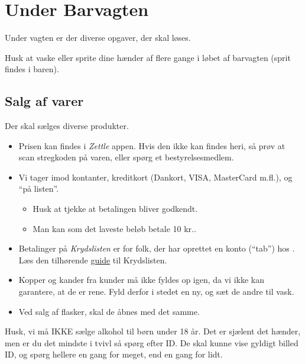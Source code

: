 \section{Under Barvagten}
\label{sec:intra-barvagten}

Under vagten er der diverse opgaver, der skal løses.

Husk at vaske eller sprite dine hænder af flere gange i løbet af barvagten
(sprit findes i baren).

\subsection{Salg af varer}
\label{sec:intra:salg}

Der skal sælges diverse produkter.
\begin{itemize}
    \item Prisen kan findes i \textit{Zettle} appen. Hvis den ikke kan findes heri, 
    så prøv at scan stregkoden på varen, eller spørg et bestyrelsesmedlem.
    \item Vi tager imod kontanter, kreditkort (Dankort, VISA, MasterCard
    m.fl.), og ``på listen''.
    \begin{itemize}
        \item Husk at tjekke at betalingen bliver godkendt.
        \item Man kan som det laveste beløb betale 10 kr..
    \end{itemize}
    \item Betalinger på \textit{Krydslisten} er for folk, der har oprettet en konto
    (``tab'') hos \fredagscafeen. Læs den tilhørende \href{https://media.fredagscafeen.dk/guides/krydsliste.pdf}{guide} til Krydslisten.
    \item Kopper og kander fra kunder må ikke fyldes op igen, da vi ikke kan garantere, at de er rene. 
    Fyld derfor i stedet en ny, og sæt de andre til vask.
    \item Ved salg af flasker, skal de åbnes med det samme.
\end{itemize}

Husk, vi må IKKE sælge alkohol til børn under 18 år. 
Det er sjælent det hænder, men er du det mindste i tvivl så spørg efter ID.
De skal kunne vise gyldigt billed ID, og spørg hellere en gang for meget, end en gang for lidt.

